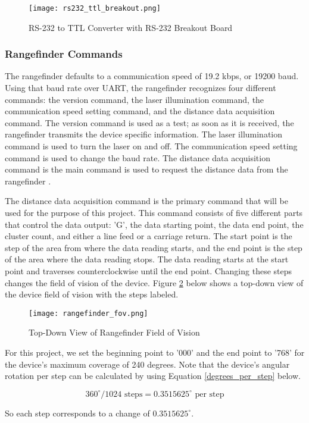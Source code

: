 \begin{figure}[H]
	\centerline{\texttt{[image: rs232\_ttl\_breakout.png]}}
	\caption{RS-232 to TTL Converter with RS-232 Breakout Board}
	\label{rs232_ttl_breakout}
\end{figure}

\subsubsection{Rangefinder Commands}
The rangefinder defaults to a communication speed of 19.2 kbps, or 19200 baud. Using that baud rate over UART, the rangefinder recognizes four different commands: the version command, the laser illumination command, the communication speed setting command, and the distance data acquisition command. The version command is used as a test; as soon as it is received, the rangefinder transmits the device specific information. The laser illumination command is used to turn the laser on and off. The communication speed setting command is used to change the baud rate. The distance data acquisition command is the main command is used to request the distance data from the rangefinder \cite{urg04lx_datasheet}.
\par
The distance data acquisition command is the primary command that will be used for the purpose of this project. This command consists of five different parts that control the data output: 'G', the data starting point, the data end point, the cluster count, and either a line feed or a carriage return. The start point is the step of the area from where the data reading starts, and the end point is the step of the area where the data reading stops. The data reading starts at the start point and traverses counterclockwise until the end point. Changing these steps changes the field of vision of the device. Figure \ref{rangefinder_fov} below shows a top-down view of the device field of vision with the steps labeled.

\begin{figure}[H]
	\centerline{\texttt{[image: rangefinder\_fov.png]}}
	\caption{Top-Down View of Rangefinder Field of Vision}
	\label{rangefinder_fov}
\end{figure}

For this project, we set the beginning point to '000' and the end point to '768' for the device's maximum coverage of 240 degrees. Note that the device's angular rotation per step can be calculated by using Equation \ref{degrees_per_step} below.

\begin{equation}
	360^\circ / 1024 \textrm{ steps}  = 0.3515625^\circ \textrm{ per step}
	\label{degrees_per_step}
\end{equation}

So each step corresponds to a change of $0.3515625^\circ$.


